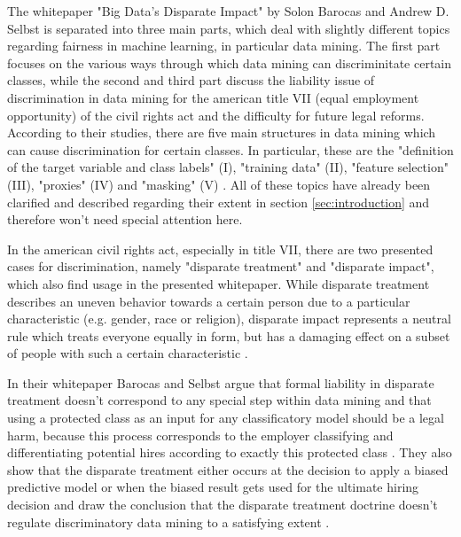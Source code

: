 The whitepaper "Big Data’s Disparate Impact" \cite{Barocas.2016} by Solon Barocas and 
Andrew D. Selbst is separated into three main parts, which deal with slightly different 
topics regarding fairness in machine learning, in particular data mining. The first part 
focuses on the various ways through which data mining can discriminitate certain classes, 
while the second and third part discuss the liability issue of discrimination in data 
mining for the american title VII (equal employment opportunity) \cite{titleVII} of the 
civil rights act and the difficulty for future legal reforms.  According to their studies, there are five main structures in data mining which can 
cause discrimination for certain classes. In particular, these are the "definition of 
the target variable and class labels" (I), "training data" (II), "feature selection" (III), 
"proxies" (IV) and "masking" (V) \cite{Barocas.2016}. All of these topics have already 
been clarified and described regarding their extent in section \ref{sec:introduction} and 
therefore won't need special attention here.

In the american civil rights act, especially in title VII, there are two presented cases 
for discrimination, namely "disparate treatment" and "disparate impact", which also find 
usage in the presented whitepaper. While disparate treatment describes an uneven behavior 
towards a certain person due to a particular characteristic (e.g. gender, race or 
religion), disparate impact represents a neutral rule which treats everyone equally in 
form, but has a damaging effect on a subset of people with such a certain characteristic \cite{titleVII}.

In their whitepaper Barocas and Selbst argue that formal liability in disparate treatment 
doesn't correspond to any special step within data mining and that using a protected 
class as an input for any classificatory model should be a legal harm, because this 
process corresponds to the employer classifying and differentiating potential hires 
according to exactly this protected class \cite{Barocas.2016}. They also show that the 
disparate treatment either occurs at the decision to apply  a biased predictive model 
or when the biased result gets used for the ultimate hiring decision and draw the 
conclusion that the disparate treatment doctrine doesn't regulate discriminatory 
data mining to a satisfying extent \cite{Barocas.2016}. 

